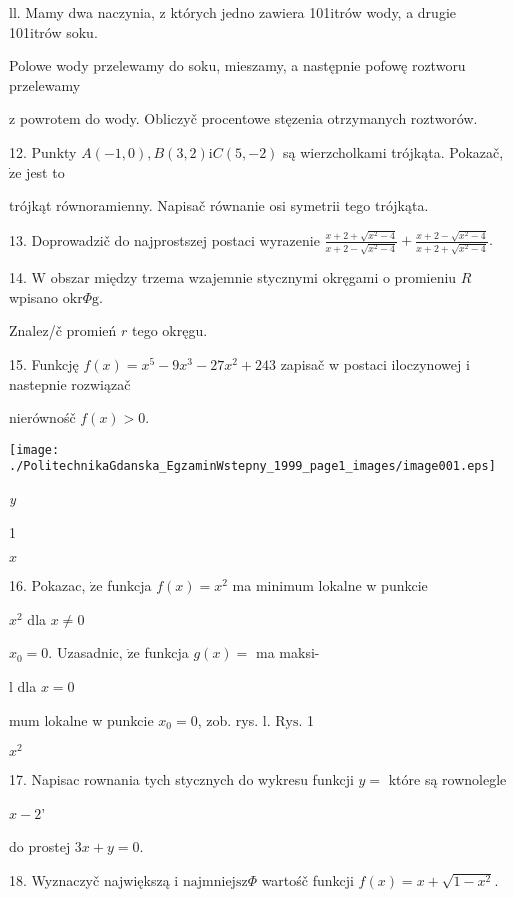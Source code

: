 \documentclass[a4paper,12pt]{article}
\begin{document}
ll. Mamy dwa naczynia, z których jedno zawiera 101itrów wody, a drugie 101itrów soku.

Polowe wody przelewamy do soku, mieszamy, a następnie pofowę roztworu przelewamy

z powrotem do wody. Obliczyč procentowe stęzenia otrzymanych roztworów.

12. Punkty $A(-1,0), B(3,2) \mathrm{i} C(5,-2)$ są wierzcholkami trójkąta. Pokazač, $\dot{\mathrm{z}}\mathrm{e}$ jest to

trójkąt równoramienny. Napisač równanie osi symetrii tego trójkąta.

13. Doprowadzič do najprostszej postaci wyrazenie $\displaystyle \frac{x+2+\sqrt{x^{2}-4}}{x+2-\sqrt{x^{2}-4}}+\frac{x+2-\sqrt{x^{2}-4}}{x+2+\sqrt{x^{2}-4}}.$

14. $\mathrm{W}$ obszar między trzema wzajemnie stycznymi okręgami o promieniu $R$ wpisano $\mathrm{o}\mathrm{k}\mathrm{r}\Phi \mathrm{g}.$

Znalez/č promień $r$ tego okręgu.

15. Funkcję $f(x)=x^{5}-9x^{3}-27x^{2}+243$ zapisač w postaci iloczynowej i nastepnie rozwiązač

nierównośč $f(x)>0.$



\begin{center}
\texttt{[image: ./PolitechnikaGdanska\_EgzaminWstepny\_1999\_page1\_images/image001.eps]}
\end{center}
{\it y}

1

$x$

16. Pokazac, $\dot{\mathrm{z}}\mathrm{e}$ funkcja $f(x) = x^{2}$ ma minimum lokalne w punkcie

$x^{2}$ dla $x\neq 0$

$x_{0} = 0$. Uzasadnic, $\dot{\mathrm{z}}\mathrm{e}$ funkcja $g(x) =$ ma maksi-

l dla $x=0$

mum lokalne w punkcie $x_{0}=0$, zob. rys. l. $\mathrm{R}\mathrm{y}\mathrm{s}$. 1

$x^{2}$

17. Napisac rownania tych stycznych do wykresu funkcji $y=$ które są rownolegle

$x-2$'

do prostej $3x+y=0.$

18. Wyznaczyč największą i $\mathrm{n}\mathrm{a}\mathrm{j}\mathrm{m}\mathrm{n}\mathrm{i}\mathrm{e}\mathrm{j}\mathrm{s}\mathrm{z}\Phi$ wartośč funkcji $f(x)=x+\sqrt{1-x^{2}}.$
\end{document}
